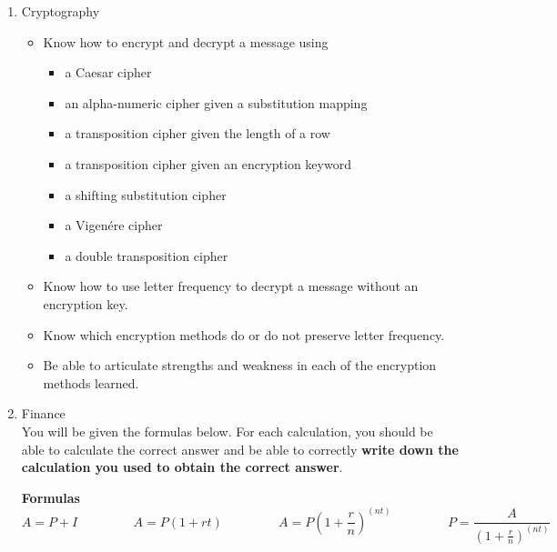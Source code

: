 \documentclass[12pt]{article}
\renewcommand{\emph}[1]{\textsf{\textbf{#1}}}
\begin{document}
\begin{enumerate}
\item Cryptography
	\begin{itemize}
	\item Know how to encrypt and decrypt a message using
		\begin{itemize}
		\item a Caesar cipher
		\item an alpha-numeric cipher given a substitution mapping
		\item a transposition cipher given the length of a row
		\item a transposition cipher given an encryption keyword
		\item a shifting substitution cipher
		\item a Vigen\'{e}re cipher
		\item a double transposition cipher
		\end{itemize}
	\item Know how to use letter frequency to decrypt a message without an encryption key.
	\item Know which encryption methods do or do not preserve letter frequency.
	\item Be able to articulate strengths and weakness in each of the encryption methods learned.
	\end{itemize}		
\item Finance\\
You will be given the formulas below. For each calculation, you should be able to calculate the correct answer and be able to correctly \emph{write down the calculation you used to obtain the correct answer}.

\textbf{Formulas}\\
$$ A=P+I \quad \hspace{1cm} \quad A=P(1+rt) \quad \hspace{1cm} \quad A=P\left(1+\frac{r}{n}\right)^{(nt)} \quad \hspace{1cm} \quad P=\frac{A}{\left( 1+\frac{r}{n}\right)^{(nt)}} $$


\end{enumerate}
\end{document}

